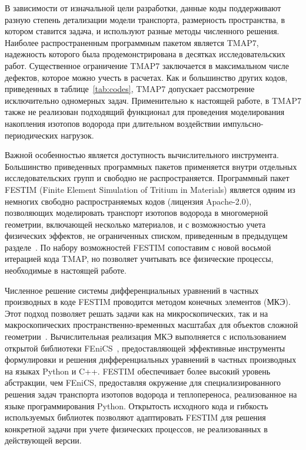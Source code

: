 В зависимости от изначальной цели разработки, данные коды поддерживают разную степень детализации модели транспорта, размерность пространства, в котором ставится задача, и используют разные методы численного решения. Наиболее распространенным программным пакетом является TMAP7, надежность которого была продемонстрирована в десятках исследовательских работ. Существенное ограничение TMAP7 заключается в максимальном числе дефектов, которое можно учесть в расчетах. Как и большинство других кодов, приведенных в таблице~\cref{tab:codes}, TMAP7 допускает рассмотрение исключительно одномерных задач. Применительно к настоящей работе, в TMAP7 также не реализован подходящий функционал для проведения моделирования накопления изотопов водорода при длительном воздействии импульсно-периодических нагрузок.

Важной особенностью является доступность вычислительного инструмента. Большинство приведенных программных пакетов применяется внутри отдельных исследовательских групп и свободно не распространяется. Программный пакет FESTIM (Finite Element Simulation of Tritium in Materials) является одним из немногих свободно распространяемых кодов (лицензия Apache-2.0), позволяющих моделировать транспорт изотопов водорода в многомерной геометрии, включающей несколько материалов, и с возможностью учета физических эффектов, не ограниченных списком, приведенным в предыдущем разделе~\cite{Kulagin2024}. По набору возможностей FESTIM сопоставим с новой восьмой итерацией кода TMAP, но позволяет учитывать все физические процессы, необходимые в настоящей работе.

Численное решение системы дифференциальных уравнений в частных производных в коде FESTIM проводится методом конечных элементов (МКЭ). Этот подход позволяет решать задачи как на микроскопических, так и на макроскопических пространственно-временных масштабах для объектов сложной геометрии~\cite{Nordlund2014}. Вычислительная реализация МКЭ выполняется с использованием открытой библиотеки FEniCS~\cite{FEniCS}, предоставляющей эффективные инструменты формулировки и решения дифференциальных уравнений в частных производных на языках Python и C++. FESTIM обеспечивает более высокий уровень абстракции, чем FEniCS, предоставляя окружение для специализированного решения задач транспорта изотопов водорода и теплопереноса, реализованное на языке программирования Python. Открытость исходного кода и гибкость используемых библиотек позволяют адаптировать FESTIM для решения конкретной задачи при учете физических процессов, не реализованных в действующей версии.

